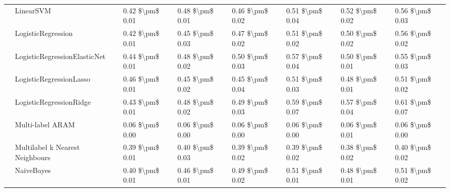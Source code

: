\begin{tabular}{llllllll}
   & LinearSVM &  0.42 \$\textbackslash pm\$ 0.01 &           0.48 \$\textbackslash pm\$ 0.01 &       0.46 \$\textbackslash pm\$ 0.02 &        0.51 \$\textbackslash pm\$ 0.04 &                         0.52 \$\textbackslash pm\$ 0.02 &      0.56 \$\textbackslash pm\$ 0.03 \\
   & LogisticRegression &  0.42 \$\textbackslash pm\$ 0.01 &           0.45 \$\textbackslash pm\$ 0.03 &       0.47 \$\textbackslash pm\$ 0.02 &        0.51 \$\textbackslash pm\$ 0.02 &                         0.50 \$\textbackslash pm\$ 0.02 &      0.56 \$\textbackslash pm\$ 0.02 \\
   & LogisticRegressionElasticNet &  0.44 \$\textbackslash pm\$ 0.01 &           0.48 \$\textbackslash pm\$ 0.02 &       0.50 \$\textbackslash pm\$ 0.03 &        0.57 \$\textbackslash pm\$ 0.04 &                         0.50 \$\textbackslash pm\$ 0.01 &      0.55 \$\textbackslash pm\$ 0.03 \\
   & LogisticRegressionLasso &  0.46 \$\textbackslash pm\$ 0.01 &           0.45 \$\textbackslash pm\$ 0.02 &       0.45 \$\textbackslash pm\$ 0.04 &        0.51 \$\textbackslash pm\$ 0.03 &                         0.48 \$\textbackslash pm\$ 0.01 &      0.51 \$\textbackslash pm\$ 0.02 \\
   & LogisticRegressionRidge &  0.43 \$\textbackslash pm\$ 0.01 &           0.48 \$\textbackslash pm\$ 0.02 &       0.49 \$\textbackslash pm\$ 0.03 &        0.59 \$\textbackslash pm\$ 0.07 &                         0.57 \$\textbackslash pm\$ 0.04 &      0.61 \$\textbackslash pm\$ 0.07 \\
   & Multi-label ARAM &  0.06 \$\textbackslash pm\$ 0.00 &           0.06 \$\textbackslash pm\$ 0.00 &       0.06 \$\textbackslash pm\$ 0.00 &        0.06 \$\textbackslash pm\$ 0.00 &                         0.06 \$\textbackslash pm\$ 0.01 &      0.06 \$\textbackslash pm\$ 0.00 \\
   & Multilabel k Nearest Neighbours &  0.39 \$\textbackslash pm\$ 0.01 &           0.40 \$\textbackslash pm\$ 0.03 &       0.39 \$\textbackslash pm\$ 0.02 &        0.39 \$\textbackslash pm\$ 0.02 &                         0.38 \$\textbackslash pm\$ 0.02 &      0.40 \$\textbackslash pm\$ 0.02 \\
   & NaiveBayes &  0.40 \$\textbackslash pm\$ 0.01 &           0.46 \$\textbackslash pm\$ 0.01 &       0.49 \$\textbackslash pm\$ 0.02 &        0.51 \$\textbackslash pm\$ 0.01 &                         0.48 \$\textbackslash pm\$ 0.01 &      0.51 \$\textbackslash pm\$ 0.02 \\

\end{tabular}
